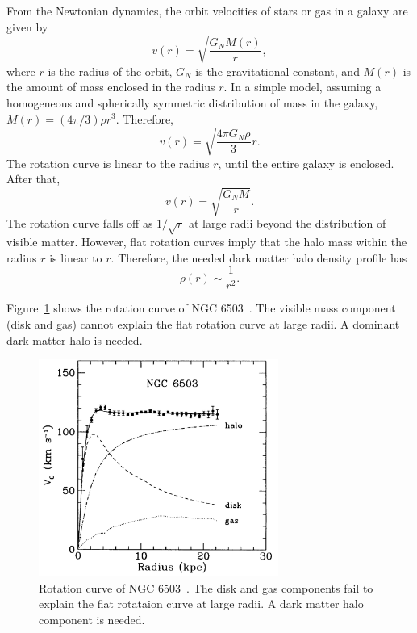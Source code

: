 \documentclass[doublespace,nopageskip]{VTthesis} %
\begin{document}
From the Newtonian dynamics, the orbit velocities of stars or gas in a galaxy are given by
\begin{equation}
    v(r) = \sqrt{\frac{G_N M(r)}{r}},
\end{equation}
where $r$ is the radius of the orbit, $G_N$ is the gravitational constant, and $M(r)$ is the amount of mass enclosed in the radius $r$. In a simple model, assuming a homogeneous and spherically symmetric distribution of mass in the galaxy, $M(r) = (4\pi/3)\rho r^3$. Therefore,
\begin{equation}
    v(r) = \sqrt{\frac{4\pi G_N \rho}{3}}r.
\end{equation}
The rotation curve is linear to the radius $r$, until the entire galaxy is enclosed. After that,
\begin{equation}
    v(r) = \sqrt{\frac{G_N M}{r}}.
\end{equation}
The rotation curve falls off as $1/\sqrt{r}$ at large radii beyond the distribution of visible matter. However, flat rotation curves imply that the halo mass within the radius $r$ is linear to $r$. Therefore, the needed dark matter halo density profile has
\begin{equation}
    \rho(r) \sim \frac{1}{r^2}.
\end{equation}

Figure~\ref{fig:rotation_curves} shows the rotation curve of NGC 6503~\cite{1991MNRAS.249..523B}. The visible mass component (disk and gas) cannot explain the flat rotation curve at large radii. A dominant dark matter halo is needed.
\begin{figure}[htb]
    \centering
    \includegraphics[width=0.7\textwidth]{Figures/Intro/rotation_curves.eps}
    \caption{Rotation curve of NGC 6503~\cite{1991MNRAS.249..523B}. The disk and gas components fail to explain the flat rotataion curve at large radii. A dark matter halo component is needed.}
    \label{fig:rotation_curves}
\end{figure}
\end{document}
